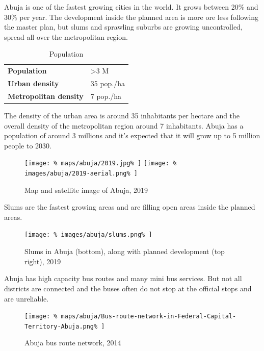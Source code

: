 \documentclass[twocolumn]{article}
\begin{document}
			Abuja is one of the fastest growing cities in the world. It grows between 20\% and 30\% per year. The development inside the planned area is more ore less following the master plan, but slums and sprawling suburbs are growing uncontrolled, spread all over the metropolitan region.
			
			\begin{table}[H]			
				\centering
				\caption{Population}
				\label{table:abuja-population}
				\begin{tabular}{|l|l|}
					\hline
					\textbf{Population}           & \textgreater 3 M \\
					\textbf{Urban density}        & 35 pop./ha \\
					\textbf{Metropolitan density} & 7 pop./ha \\
					\hline
				\end{tabular}
			\end{table}
			
			The density of the urban area is around 35 inhabitants per hectare and the overall density of the metropolitan region around 7 inhabitants.
			Abuja has a population of around 3 millions and it's expected that it will grow up to 5 million people to 2030.
			
			\begin{figure}[H]			
				\texttt{[image: \%
					maps/abuja/2019.jpg\%
				]}
				\texttt{[image: \%
					images/abuja/2019-aerial.png\%
				]}
				\caption{Map\cite{OpenStreetMap:Abuja} and satellite image\cite{Satellites.pro:Abuja} of Abuja, 2019}
				\label{fig:map:abuja-map-satellite-2019}
			\end{figure}
			
			Slums are the fastest growing areas and are  filling open areas inside the planned areas.
			
			\begin{figure}[H]
				\texttt{[image: \%
					images/abuja/slums.png\%
				]}
				\caption{Slums in Abuja (bottom), along with planned development (top right), 2019\cite{Satellites.pro:Abuja}}
				\label{fig:images:abuja-slums}
			\end{figure}
			
			Abuja has high capacity bus routes and many mini bus services. But not all districts are connected and the buses often do not stop at the official stops and are unreliable.
			
			\begin{figure}[H]
				\texttt{[image: \%
					maps/abuja/Bus-route-network-in-Federal-Capital-Territory-Abuja.png\%
				]}
				\caption{Abuja bus route network, 2014\cite{ResearchGate:AbujaBusRouteNetwork}}
				\label{fig:map:abuja-bus-route-network}
			\end{figure}
			
\end{document}
